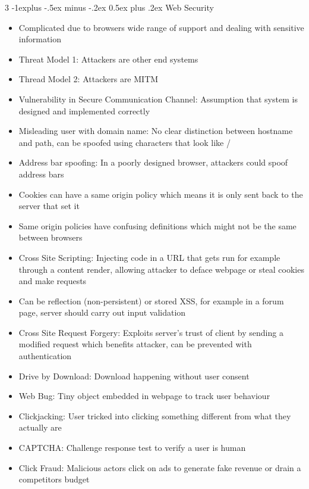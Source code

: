 \documentclass[10pt, landscape]{article}
\makeatletter
\renewcommand{\section}{\@startsection{section}{1}{0mm}%
                                {-1ex plus -.5ex minus -.2ex}%
                                {0.5ex plus .2ex}%
                                {\normalfont\large\bfseries}}
\renewcommand{\section}{\@startsection{section}{2}{0mm}%
                                {-1explus -.5ex minus -.2ex}%
                                {0.5ex plus .2ex}%
                                {\normalfont\normalsize\bfseries}}
\makeatother
\begin{document}
\begin{multicols*}{3}
\section{Web Security}
\begin{itemize}
    \item Complicated due to browsers wide range of support and dealing with sensitive information
    \item Threat Model 1: Attackers are other end systems
    \item Thread Model 2: Attackers are MITM
    \item Vulnerability in Secure Communication Channel: Assumption that system is designed and implemented correctly
    \item Misleading user with domain name: No clear distinction between hostname and path, can be spoofed using characters that look like /
    \item Address bar spoofing: In a poorly designed browser, attackers could spoof address bars
    \item Cookies can have a same origin policy which means it is only sent back to the server that set it
    \item Same origin policies have confusing definitions which might not be the same between browsers
    \item Cross Site Scripting: Injecting code in a URL that gets run for example through a content render, allowing attacker to deface webpage or steal cookies and make requests
    \item Can be reflection (non-persistent) or stored XSS, for example in a forum page, server should carry out input validation
    \item Cross Site Request Forgery: Exploits server's trust of client by sending a modified request which benefits attacker, can be prevented with authentication
    \item Drive by Download: Download happening without user consent
    \item Web Bug: Tiny object embedded in webpage to track user behaviour
    \item Clickjacking: User tricked into clicking something different from what they actually are
    \item CAPTCHA: Challenge response test to verify a user is human
    \item Click Fraud: Malicious actors click on ads to generate fake revenue or drain a competitors budget
\end{itemize}


\end{multicols*}
\end{document}
